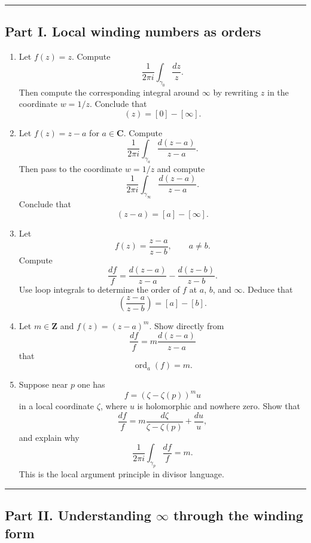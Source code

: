\documentclass[11pt]{article}
\begin{document}
	\bigskip
	\hrule
	\bigskip
	
	\subsection*{Part I. Local winding numbers as orders}
	
	\begin{enumerate}
		\item Let \(f(z)=z\). Compute
		\[
		\frac{1}{2\pi i}\int_{\gamma_0}\frac{dz}{z}.
		\]
		Then compute the corresponding integral around \(\infty\) by rewriting \(z\) in the coordinate \(w=1/z\). Conclude that
		\[
		(z)=[0]-[\infty].
		\]
		
		\item Let \(f(z)=z-a\) for \(a\in\mathbf{C}\). Compute
		\[
		\frac{1}{2\pi i}\int_{\gamma_a}\frac{d(z-a)}{z-a}.
		\]
		Then pass to the coordinate \(w=1/z\) and compute
		\[
		\frac{1}{2\pi i}\int_{\gamma_\infty}\frac{d(z-a)}{z-a}.
		\]
		Conclude that
		\[
		(z-a)=[a]-[\infty].
		\]
		
		\item Let
		\[
		f(z)=\frac{z-a}{z-b},
		\qquad a\neq b.
		\]
		Compute
		\[
		\frac{df}{f}
		=
		\frac{d(z-a)}{z-a}-\frac{d(z-b)}{z-b}.
		\]
		Use loop integrals to determine the order of \(f\) at \(a\), \(b\), and \(\infty\). Deduce that
		\[
		\left(\frac{z-a}{z-b}\right)=[a]-[b].
		\]
		
		\item Let \(m\in\mathbf{Z}\) and \(f(z)=(z-a)^m\). Show directly from
		\[
		\frac{df}{f}=m\frac{d(z-a)}{z-a}
		\]
		that
		\[
		\operatorname{ord}_a(f)=m.
		\]
		
		\item Suppose near \(p\) one has
		\[
		f=(\zeta-\zeta(p))^m u
		\]
		in a local coordinate \(\zeta\), where \(u\) is holomorphic and nowhere zero. Show that
		\[
		\frac{df}{f}=m\frac{d\zeta}{\zeta-\zeta(p)}+\frac{du}{u},
		\]
		and explain why
		\[
		\frac{1}{2\pi i}\int_{\gamma_p}\frac{df}{f}=m.
		\]
		This is the local argument principle in divisor language.
	\end{enumerate}
	
	\bigskip
	\hrule
	\bigskip
	
	\subsection*{Part II. Understanding \texorpdfstring{$\infty$}{infinity} through the winding form}
	
\end{document}
